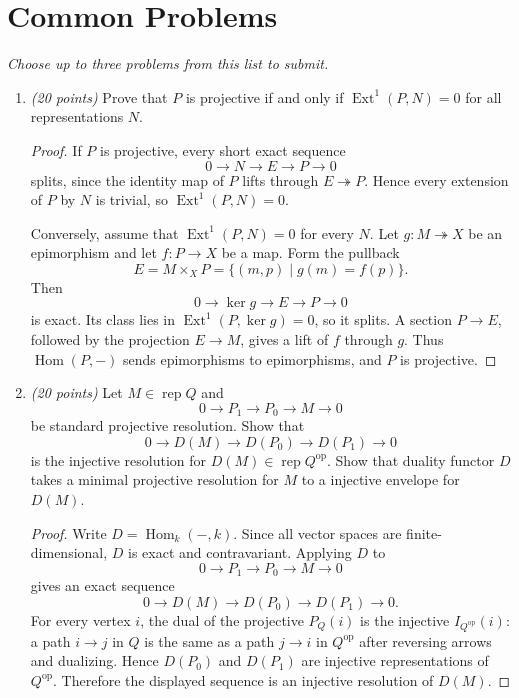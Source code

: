 \documentclass[11pt]{article}
\newcommand{\points}[1]{\textit{(#1 points)}}
\begin{document}
\section*{Common Problems}

\textit{Choose up to three problems from this list to submit.}

\begin{enumerate}[label=\arabic*., leftmargin=2em, itemsep=1.1em]
  \item \points{20} Prove that $P$ is projective if and only if
    $\operatorname{Ext}^1(P,N)=0$ for all representations $N$.
    \begin{proof}
      If $P$ is projective, every short exact sequence
      \[
        0\to N\to E\to P\to0
      \]
      splits, since the identity map of $P$ lifts through $E\twoheadrightarrow P$.
      Hence every extension of $P$ by $N$ is trivial, so
      $\operatorname{Ext}^1(P,N)=0$.

      Conversely, assume that $\operatorname{Ext}^1(P,N)=0$ for every $N$. Let
      $g:M\twoheadrightarrow X$ be an epimorphism and let $f:P\to X$ be a map.
      Form the pullback
      \[
        E=M\times_X P=\{(m,p)\mid g(m)=f(p)\}.
      \]
      Then
      \[
        0\to \ker g\to E\to P\to0
      \]
      is exact. Its class lies in $\operatorname{Ext}^1(P,\ker g)=0$, so it
      splits. A section $P\to E$, followed by the projection $E\to M$, gives a
      lift of $f$ through $g$. Thus $\operatorname{Hom}(P,-)$ sends epimorphisms
      to epimorphisms, and $P$ is projective.
    \end{proof}

  \item \points{20} Let $M \in \operatorname{rep} Q$ and
    \[
      0 \to P_1 \to P_0 \to M \to 0
    \]
    be standard projective resolution. Show that
    \[
      0 \to D(M) \to D(P_0) \to D(P_1) \to 0
    \]
    is the injective resolution for $D(M) \in \operatorname{rep} Q^{\mathrm{op}}$.
    Show that duality functor $D$ takes a minimal projective resolution for $M$ to
    a injective envelope for $D(M)$.
    \begin{proof}
      Write $D=\operatorname{Hom}_k(-,k)$. Since all vector spaces are
      finite-dimensional, $D$ is exact and contravariant. Applying $D$ to
      \[
        0\to P_1\to P_0\to M\to0
      \]
      gives an exact sequence
      \[
        0\to D(M)\to D(P_0)\to D(P_1)\to0.
      \]
      For every vertex $i$, the dual of the projective $P_Q(i)$ is the injective
      $I_{Q^{\mathrm{op}}}(i)$: a path $i\to j$ in $Q$ is the same as a path
      $j\to i$ in $Q^{\mathrm{op}}$ after reversing arrows and dualizing. Hence
      $D(P_0)$ and $D(P_1)$ are injective representations of $Q^{\mathrm{op}}$.
      Therefore the displayed sequence is an injective resolution of $D(M)$.


\end{proof}
\end{enumerate}
\end{document}
